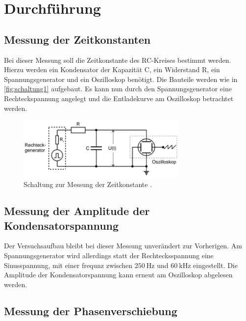 \section{Durchführung}
\label{sec:Durchführung}


\subsection{Messung der Zeitkonstanten}

\sloppy
Bei dieser Messung soll die Zeitkonstante des RC-Kreises bestimmt werden. Hierzu werden ein Kondensator der Kapazität C, ein Widerstand R, 
ein Spannungsgenerator und ein Oszilloskop benötigt. Die Bauteile werden wie in \autoref{fig:schaltung1} aufgebaut. Es kann nun durch den 
Spannungsgenerator eine Rechteckspannung angelegt und die Entladekurve am Oszilloskop betrachtet werden.
\begin{figure}[H]
    \centering
    \includegraphics[width=0.75\textwidth]{Dateien/Schaltung1.jpg}
    \caption{Schaltung zur Messung der Zeitkonstante \cite{anleitung353}.}
    \label{fig:schaltung1}
\end{figure}


\subsection{Messung der Amplitude der Kondensatorspannung}
Der Versuchsaufbau bleibt bei dieser Messung unverändert zur Vorherigen. Am Spannungsgenerator wird allerdings statt der Rechtecksspannung 
eine Sinusspannung, mit einer frequnz zwischen $\SI{250}{\hertz}$ und $\SI{60}{\kilo\hertz}$ eingestellt. Die Amplitude der 
Kondensatorspannung kann erneut am Oszilloskop abgelesen werden.


\subsection{Messung der Phasenverschiebung}

